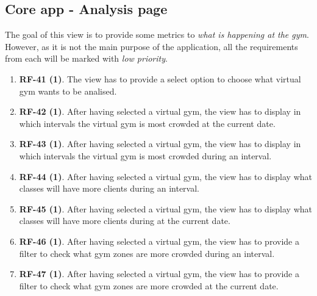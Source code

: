 \documentclass[a4paper, 12pt, oneside]{book}
\begin{document}
\subsection{Core app - Analysis page}
The goal of this view is to provide some metrics to \emph{what is happening at the gym}. However, as it is not the main purpose of the application, all the requirements from each will be marked with \emph{low priority}.
\begin{enumerate}[label = -]
	\item \textbf{RF-41 (1)}. The view has to provide a select option to choose what virtual gym wants to be analised.
	\item \textbf{RF-42 (1)}. After having selected a virtual gym, the view has to display in which intervals the virtual gym is most crowded at the current date.
	\item \textbf{RF-43 (1)}. After having selected a virtual gym, the view has to display in which intervals the virtual gym is most crowded during an interval.
	\item \textbf{RF-44 (1)}. After having selected a virtual gym, the view has to display what classes will have more clients during an interval.
	\item \textbf{RF-45 (1)}. After having selected a virtual gym, the view has to display what classes will have more clients during at the current date.
	\item \textbf{RF-46 (1)}. After having selected a virtual gym, the view has to provide a filter to check what gym zones are more crowded during an interval.
	\item \textbf{RF-47 (1)}. After having selected a virtual gym, the view has to provide a filter to check what gym zones are more crowded at the current date.
\end{enumerate}
\end{document}
